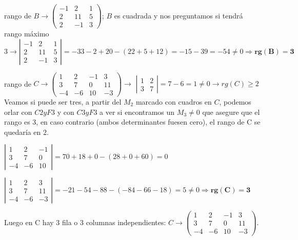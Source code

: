 \begin{proofw}
\noindent  * rango de $B \to \left( \begin{matrix} -1&2&1\\2&11&5\\2&-1&3  \end{matrix} \right)$; $B$ es cuadrada y nos preguntamos si tendrá rango máximo $3 \to \left| \begin{matrix} -1&2&1\\2&11&5\\2&-1&3  \end{matrix} \right|=-33-2+20-(22+5+12)=-15-39=-54\neq 0 \Rightarrow \boldsymbol{rg(B)=3}$


\noindent  * rango de $C \to \left( \begin{matrix}  \boxed{1}&\boxed{2}&-1&3\\\boxed{3}&\boxed{7}&0&11\\-4&-6&10&-3 \end{matrix} \right) \to $
$\left| \begin{matrix} 1&2\\3&7 \end{matrix} \right|=7-6=1\neq 0 \to rg(C)\ge 2\;$ 
Veamos si puede ser tres, a partir del $M_2$ marcado con cuadros en $C$, podemos orlar con $C2 y F3$ y con $C3 y F3$ a ver si encontramos un $M_3 \neq 0$ que asegure que el rango es $3$, en caso contrario (ambos determinantes fuesen cero), el rango de C se quedaría en $2$.

\noindent $\left| \begin{matrix} \boxed{1}&\boxed{2}&-1\\ \boxed{3}&\boxed{7}&0 \\-4&-6&10 \end{matrix} \right|=70+18+0-(28+0+60)=0$

\noindent $\left| \begin{matrix} \boxed{1}&\boxed{2}&3\\ \boxed{3}&\boxed{7}&11 \\-4&-6&-3 \end{matrix} \right|= -21-54-88-(-84-66-18)=5\neq 0 \Rightarrow \boldsymbol{rg(C)=3}$

\noindent \textcolor{gris}{\small{Luego en C hay $3$ fila o $3$ columnas independientes: $C \to \left( \begin{matrix}  \boxed{1}&\boxed{2}&-1&\boxed{3}\\\boxed{3}&\boxed{7}&0&\boxed{11}\\-4&-6&10&\boxed{-3} \end{matrix} \right)$}\normalsize{.}}


\end{proofw}
